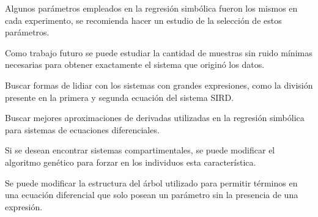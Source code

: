 \begin{recomendations}

    Algunos parámetros empleados en la regresión simbólica fueron los mismos en cada experimento, se recomienda hacer un estudio de la selección de estos parámetros.

    Como trabajo futuro se puede estudiar la cantidad de muestras sin ruido mínimas necesarias para obtener exactamente el sistema que originó los datos.

    Buscar formas de lidiar con los sistemas con grandes expresiones, como la división presente en la primera y segunda ecuación del sistema SIRD.

    Buscar mejores aproximaciones de derivadas utilizadas en la regresión simbólica para sistemas de ecuaciones diferenciales.

    Si se desean encontrar sistemas compartimentales, se puede modificar el algoritmo genético para forzar en los individuos esta característica.

    Se puede modificar la estructura del árbol utilizado para permitir términos en una ecuación diferencial que solo posean un parámetro sin la presencia de una expresión.

\end{recomendations}

